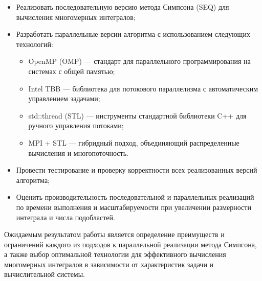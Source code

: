\documentclass[12pt]{article}
\begin{document}
\begin{itemize}
\item Реализовать последовательную версию метода Симпсона (SEQ) для вычисления многомерных интегралов;
\item Разработать параллельные версии алгоритма с использованием следующих технологий:
\begin{itemize}
\item OpenMP (OMP) — стандарт для параллельного программирования на системах с общей памятью;
\item Intel TBB — библиотека для потокового параллелизма с автоматическим управлением задачами;
\item std::thread (STL) — инструменты стандартной библиотеки C++ для ручного управления потоками;
\item MPI + STL — гибридный подход, объединяющий распределенные вычисления и многопоточность.
\end{itemize}
\item Провести тестирование и проверку корректности всех реализованных версий алгоритма;
\item Оценить производительность последовательной и параллельных реализаций по времени выполнения и масштабируемости при увеличении размерности интеграла и числа подобластей.
\end{itemize}

Ожидаемым результатом работы является определение преимуществ и ограничений каждого из подходов к параллельной реализации метода Симпсона, а также выбор оптимальной технологии для эффективного вычисления многомерных интегралов в зависимости от характеристик задачи и вычислительной системы.
\end{document}
